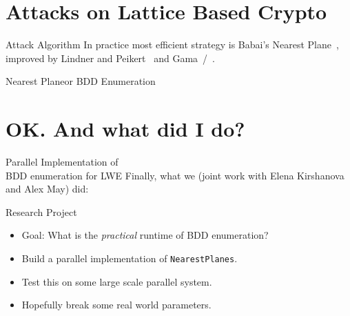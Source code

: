 \section{Attacks on Lattice Based Crypto}
\begin{frame}{Attack Algorithm}
    \centering
    In practice most efficient strategy is Babai's Nearest Plane~\cite{babai},\\
    improved by Lindner and Peikert~\cite{lindner_peikert} and Gama~\etal/~\cite{gama}.
\end{frame}

\begin{frame}{Nearest Plane}{or BDD Enumeration}
\end{frame}

\section{OK\@. And what did I do?}
\begin{frame}{Parallel Implementation of\\BDD enumeration for LWE}
    \centering
    Finally, what we (joint work with Elena Kirshanova and Alex May) did:
    \begin{block}{Research Project}
        \begin{itemize}
            \item Goal: What is the \emph{practical} runtime of BDD enumeration?
            \item Build a parallel implementation of \texttt{NearestPlanes}.
            \item Test this on some large scale parallel system.
            \item Hopefully break some real world parameters.
        \end{itemize}
    \end{block}
\end{frame}

